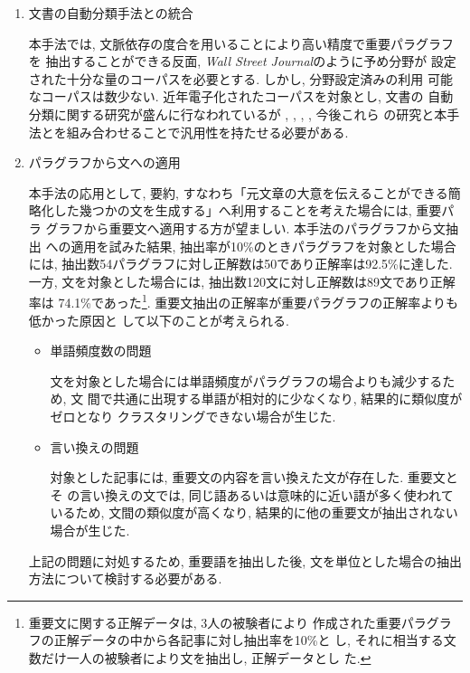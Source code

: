 \begin{enumerate}

\item 文書の自動分類手法との統合

本手法では, 文脈依存の度合を用いることにより高い精度で重要パラグラフを
抽出することができる反面, {\it Wall Street Journal}のように予め分野が
設定された十分な量のコーパスを必要とする.  しかし, 分野設定済みの利用
可能なコーパスは数少ない.  近年電子化されたコーパスを対象とし, 文書の
自動分類に関する研究が盛んに行なわれているが \cite{Blosseville1992},
\cite{Lewis1992}, \cite{Tokunaga1994}, \cite{Fukumoto1996}, 今後これら
の研究と本手法とを組み合わせることで汎用性を持たせる必要がある.

\item パラグラフから文への適用

本手法の応用として, 要約, すなわち「元文章の大意を伝えることができる簡
略化した幾つかの文を生成する」へ利用することを考えた場合には, 重要パラ
グラフから重要文へ適用する方が望ましい.  本手法のパラグラフから文抽出
への適用を試みた結果, 抽出率が10\%のときパラグラフを対象とした場合には, 
抽出数54パラグラフに対し正解数は50であり正解率は92.5\%に達した.  一方, 
文を対象とした場合には, 抽出数120文に対し正解数は89文であり正解率は
74.1\%であった\footnote{重要文に関する正解データは, 3人の被験者により
作成された重要パラグラフの正解データの中から各記事に対し抽出率を10\%と
し, それに相当する文数だけ一人の被験者により文を抽出し, 正解データとし
た.}.  重要文抽出の正解率が重要パラグラフの正解率よりも低かった原因と
して以下のことが考えられる.

\begin{itemize}
\item 単語頻度数の問題

文を対象とした場合には単語頻度がパラグラフの場合よりも減少するため, 文
間で共通に出現する単語が相対的に少なくなり, 結果的に類似度がゼロとなり
クラスタリングできない場合が生じた.

\item 言い換えの問題

対象とした記事には, 重要文の内容を言い換えた文が存在した.  重要文とそ
の言い換えの文では, 同じ語あるいは意味的に近い語が多く使われているため, 
文間の類似度が高くなり, 結果的に他の重要文が抽出されない場合が生じた.


\end{itemize}

\noindent
上記の問題に対処するため, 重要語を抽出した後, 文を単位とした場合の抽出
方法について検討する必要がある.

\end{enumerate}



